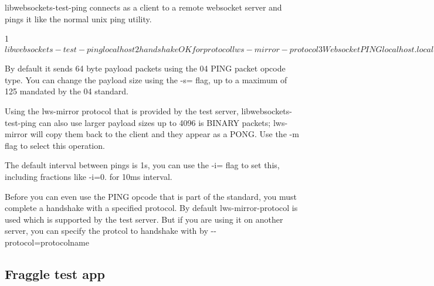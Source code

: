 libwebsockets-\/test-\/ping connects as a client to a remote websocket server and pings it like the normal unix ping utility. 
\begin{DoxyCode}
1 $ libwebsockets-test-ping localhost
2 handshake OK for protocol lws-mirror-protocol
3 Websocket PING localhost.localdomain (127.0.0.1) 64 bytes of data.
4 64 bytes from localhost: req=1 time=0.1ms
5 64 bytes from localhost: req=2 time=0.1ms
6 64 bytes from localhost: req=3 time=0.1ms
7 64 bytes from localhost: req=4 time=0.2ms
8 64 bytes from localhost: req=5 time=0.1ms
9 64 bytes from localhost: req=6 time=0.2ms
10 64 bytes from localhost: req=7 time=0.2ms
11 64 bytes from localhost: req=8 time=0.1ms
12 ^C
13 --- localhost.localdomain websocket ping statistics ---
14 8 packets transmitted, 8 received, 0%
15 rtt min/avg/max = 0.110/0.185/0.218 ms
16 $
\end{DoxyCode}
 By default it sends 64 byte payload packets using the 04 P\+I\+NG packet opcode type. You can change the payload size using the {\ttfamily -\/s=} flag, up to a maximum of 125 mandated by the 04 standard.

Using the lws-\/mirror protocol that is provided by the test server, libwebsockets-\/test-\/ping can also use larger payload sizes up to 4096 is B\+I\+N\+A\+RY packets; lws-\/mirror will copy them back to the client and they appear as a P\+O\+NG. Use the {\ttfamily -\/m} flag to select this operation.

The default interval between pings is 1s, you can use the -\/i= flag to set this, including fractions like {\ttfamily -\/i=0.} for 10ms interval.

Before you can even use the P\+I\+NG opcode that is part of the standard, you must complete a handshake with a specified protocol. By default lws-\/mirror-\/protocol is used which is supported by the test server. But if you are using it on another server, you can specify the protcol to handshake with by {\ttfamily -\/-\/protocol=protocolname}

\subsection*{Fraggle test app }

